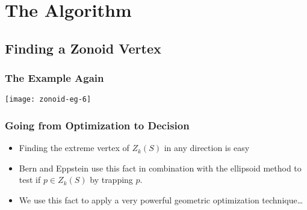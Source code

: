 \documentclass{beamer}
\begin{document}
\section{The Algorithm}

\subsection{Finding a Zonoid Vertex}


\frame
{
   \frametitle{The Example Again}
   \begin{center}
    \texttt{[image: zonoid-eg-6]}
   \end{center}
}



\frame
{
   \frametitle{Going from Optimization to Decision}
 \begin{itemize}
   \item<1->Finding the extreme vertex of $Z_k(S)$ in any direction
	is easy
   \item<2->Bern and Eppstein use this fact in combination with the 
	ellipsoid method to test if 
	$p\in Z_k(S)$ by trapping $p$.
   \item<3-> We use this fact to apply a very powerful
	geometric optimization technique\ldots
  \end{itemize}
}
\end{document}
